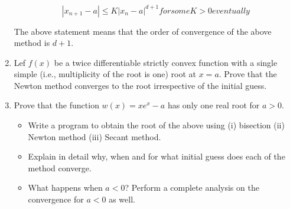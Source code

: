 \documentclass{article}
\begin{document}
\begin{enumerate}
\begin{equation*}
|x_{n+1} - a| \leq K |x_{n} - a|^{d+1} for some K > 0 eventually
\end{equation*}

The above statement means that the order of convergence of the above method is $d+1$.

\item Lef $f(x)$ be a twice differentiable strictly convex function with a single simple
(i.e., multiplicity of the root is one) root at $x = a$. Prove that the Newton method 
converges to the root irrespective of the initial guess.

\item Prove that the function $w(x) = xe^{x} - a$ has only one real root for $a > 0$.
\begin{itemize}
\item Write a program to obtain the root of the above using (i) bisection (ii) Newton
method (iii) Secant method.
\item Explain in detail why, when and for what initial guess does each of the method
converge.
\item What happens when $a < 0$? Perform a complete analysis on the convergence for $a <
0$ as well.
\end{itemize}

\end{enumerate}
\end{document}
